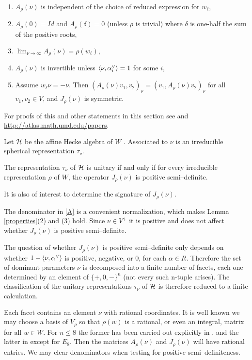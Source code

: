 \begin{lemma}
\label{properties}
\begin{enumerate}
\item $A_\rho(\nu)$ is independent of the choice of reduced
expression for $w_\ell$,
\item $A_\rho(0)=Id$ and $A_\rho(\delta)=0$ (unless $\rho$ is
  trivial) where $\delta$ is one-half
  the sum of the positive roots,
\item $\lim_{\nu\rightarrow\infty}A_\rho(\nu)=\rho(w_\ell)$,
\item $A_\rho(\nu)$ is invertible unless $\langle\nu,\alpha^\vee_i\rangle=1$ for
some $i$,
\item Assume $w_\ell\nu=-\nu$. Then $(A_\rho(\nu)v_1,v_2)_\rho=(v_1,A_\rho(\nu)v_2)_\rho$ for all
$v_1,v_2\in V$, and $J_\rho(\nu)$ is symmetric.
\end{enumerate}
\end{lemma}

For proofs of this and other statements in this section see
\cite{barbasch_spherical} and 
\url{http://atlas.math.umd.edu/papers}.

Let ${\mathcal H}$ be the affine Hecke algebra of $W$ \cite[Chapter 7]{humphreys_coxeter}.
Associated to $\nu$ is an irreducible spherical representation $\tau_{\nu}$.


\begin{lemma}
\label{tau}
The representation $\tau_\nu$ of ${\mathcal H}$ is unitary if and only if 
for every irreducible representation $\rho$ of $W$, the operator
$J_\rho(\nu)$ is positive semi--definite.
\end{lemma}

It is also of interest to determine the signature of $J_\rho(\nu)$.

The denominator in \eqref{A} is a convenient normalization, which
makes Lemma \ref{properties}(2) and (3) hold. 
Since
$\nu\in V^+$ it is positive and does not affect whether
$J_\rho(\nu)$ is positive semi--definite.

The question of whether $J_\rho(\nu)$ is positive
semi--definite only depends on whether $1-\langle\nu,\alpha^\vee\rangle$ is
positive, negative, or $0$, for each $\alpha\in R$. Therefore the set
of dominant parameters $\nu$ is decomposed into a finite number of
facets, each one determined by an element of $\{+,0,-\}^n$ (not every
such n-tuple arises). 
The classification of the unitary representations $\tau_\nu$ of 
${\mathcal H}$ is therefore reduced to a finite calculation.

Each facet contains an element $\nu$ with rational coordinates. It is
well known we may choose a basis of $V_\rho$ so that $\rho(w)$ is
a rational, or even an integral, matrix for all $w\in W$. For $n\le 8$
the former has been carried out explicitly in \cite{stembridge_models}, and
the latter in \cite{adams_models} except for $E_8$. Then the matrices
$A_\rho(\nu)$ and $J_\rho(\nu)$ will have rational
entries.  We may clear denominators when testing for positive
semi--definiteness. 

